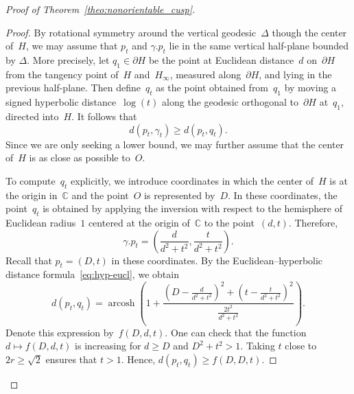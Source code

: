 \documentclass[11pt,reqno]{amsart}
\theoremstyle{definition}
\numberwithin{equation}{section}
\newcommand\C {{\mathbb C}}
\newcommand{\HH}{{\mathbb H}}
\DeclareMathOperator{\arcosh}{arcosh}
\numberwithin{equation}{section}
\begin{document}
\begin{proof}[Proof of Theorem~\ref{theo:nonorientable_cusp}]
\begin{proof}
By rotational symmetry around the vertical geodesic~$\Delta$ though the center of~$H$, we may assume that $p_t$ and $\gamma.p_t$ lie in the same vertical half-plane bounded by $\Delta$.
More precisely, let $q_1 \in \partial H$ be the point at Euclidean distance~$d$ on~$\partial H$ from the tangency point of~$H$ and~$H_\infty$, measured along~$\partial H$, and lying in the previous half-plane.
Then define~$q_t$ as the point obtained from~$q_1$ by moving a signed hyperbolic distance~$\log(t)$ along the geodesic orthogonal to~$\partial H$ at~$q_1$, directed into~$H$.
It follows that
\[
d(p_t,\gamma_t) \geq d(p_t,q_t).
\]
Since we are only seeking a lower bound, we may further assume that the center of~$H$ is as close as possible to~$O$.

To compute~$q_t$ explicitly, we introduce coordinates in which the center of~$H$ is at the origin in~$\C$ and the point~$O$ is represented by~$D$.
In these coordinates, the point~$q_t$ is obtained by applying the inversion with respect to the hemisphere of Euclidean radius~$1$ centered at the origin of~$\C$ to the point~$(d,t)$.
Therefore,
\[
\gamma.p_t = \left( \frac{d}{d^2+t^2}, \frac{t}{d^2+t^2} \right).
\]
Recall that $p_t=(D,t)$ in these coordinates.
By the Euclidean--hyperbolic distance formula~\eqref{eq:hyp-eucl}, we obtain
\[
d(p_t,q_t) = \arcosh \left( 1+\frac{\left( D - \frac{d}{d^2+t^2} \right)^2 + \left( t - \frac{t}{d^2+t^2} \right)^2}{\frac{2 t^2}{d^2+t^2}} \right).
\]
Denote this expression by~$f(D,d,t)$.
One can check that the function $d \mapsto f(D,d,t)$ is increasing for $d \geq D$ and $D^2+t^2 >1$.
Taking $t$ close to~$2r \geq \sqrt{2}$ ensures that $t>1$.
Hence, $d(p_t,q_t) \geq f(D,D,t)$.


\end{proof}
\end{proof}
\end{document}
